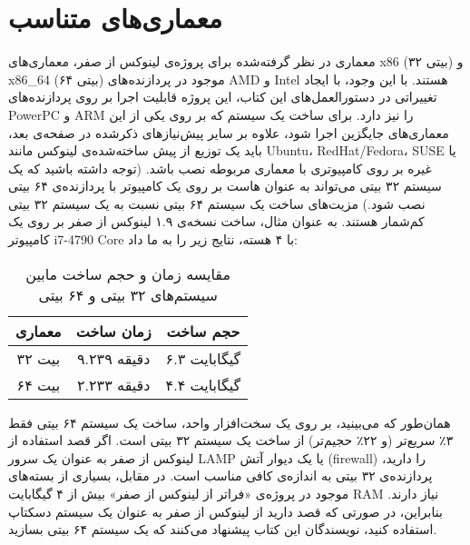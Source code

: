 \documentclass{book}
\begin{document}
\newpage

\section{معماری‌های متناسب}

معماری در نظر گرفته‌شده برای پروژه‌ی لینوکس از صفر، معماری‌های x86 (۳۲ بیتی) و x86\_64 (۶۴ بیتی) موجود در پردازنده‌های AMD و Intel هستند. با این وجود، با ایجاد تغییراتی در دستورالعمل‌های این کتاب، این پروژه قابلیت اجرا بر روی پردازنده‌های PowerPC و ARM را نیز دارد. برای ساخت یک سیستم که بر روی یکی از این معماری‌های جایگزین اجرا شود، علاوه بر سایر پیش‌نیازهای ذکرشده در صفحه‌ی بعد، باید یک توزیع از پیش ساخته‌شده‌ی لینوکس مانند Ubuntu، RedHat/Fedora، SUSE یا غیره بر روی کامپیوتری با معماری مربوطه نصب باشد. (توجه داشته باشید که یک سیستم ۳۲ بیتی می‌تواند به عنوان هاست بر روی یک کامپیوتر با پردازنده‌ی ۶۴ بیتی نصب شود.)
\newline
\newline
مزیت‌های ساخت یک سیستم ۶۴ بیتی نسبت به یک سیستم ۳۲ بیتی کم‌شمار هستند. به عنوان مثال، ساخت نسخه‌ی ۱.۹ لینوکس از صفر بر روی یک کامپیوتر i7-4790 Core با ۴ هسته، نتایج زیر را به ما داد:
\newline
\newline
\begin{table}[h]
    \centering
    \begin{tabular}{|c|c|c|}
        \hline
        معماری & زمان ساخت & حجم ساخت \\
        \hline
        ۳۲ بیت   & ۹.۲۳۹ دقیقه   & ۶.۳ گیگابایت   \\
        ۶۴ بیت   & ۲.۲۳۳ دقیقه   & ۴.۴ گیگابایت   \\
        \hline
    \end{tabular}
    \caption{مقایسه زمان و حجم ساخت مابین سیستم‌های ۳۲ بیتی و ۶۴ بیتی}
\end{table}
\newline
\newline
همان‌طور که می‌بینید، بر روی یک سخت‌افزار واحد، ساخت یک سیستم ۶۴ بیتی فقط ۳٪ سریع‌تر (و ۲۲٪ حجیم‌تر) از ساخت یک سیستم ۳۲ بیتی است. اگر قصد استفاده از لینوکس از صفر به عنوان یک سرور LAMP یا یک دیوار آتش (firewall) را دارید، پردازنده‌ی ۳۲ بیتی به اندازه‌ی کافی مناسب است. در مقابل، بسیاری از بسته‌های موجود در پروژه‌ی «فراتر از لینوکس از صفر» بیش از ۴ گیگابایت RAM نیاز دارند. بنابراین، در صورتی که قصد دارید از لینوکس از صفر به عنوان یک سیستم دسکتاپ استفاده کنید، نویسندگان این کتاب پیشنهاد می‌کنند که یک سیستم ۶۴ بیتی بسازید.
\newline
\end{document}
